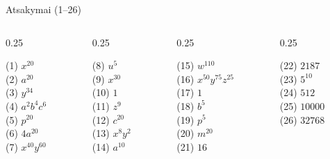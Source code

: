 \documentclass[aspectratio=169,10pt]{beamer}
\begin{document}
\begin{frame}{Atsakymai (1--26)}

    \begin{columns}[T]

        \begin{column}{0.25\textwidth}
            \small

            (1) $x^{20}$\\
            (2) $a^{20}$\\
            (3) $y^{34}$\\
            (4) $a^2b^4c^6$\\
            (5) $p^{20}$\\
            (6) $4a^{20}$\\
            (7) $x^{40}y^{60}$

        \end{column}

        \begin{column}{0.25\textwidth}
            \small

            (8) $u^5$\\
            (9) $x^{30}$\\
            (10) $1$\\
            (11) $z^9$\\
            (12) $c^{20}$\\
            (13) $x^8y^2$\\
            (14) $a^{10}$

        \end{column}

        \begin{column}{0.25\textwidth}
            \small

            (15) $w^{110}$\\
            (16) $x^{50}y^{75}z^{25}$\\
            (17) $1$\\
            (18) $b^5$\\
            (19) $p^5$\\
            (20) $m^{20}$\\
            (21) $16$

        \end{column}

        \begin{column}{0.25\textwidth}
            \small

            (22) $2187$\\
            (23) $5^{10}$\\
            (24) $512$\\
            (25) $10000$\\
            (26) $32768$

        \end{column}

    \end{columns}

\end{frame}


\end{document}
